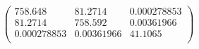 \documentclass{article}
\begin{document}
\[\left(
\begin{array}{ccc}
 758.648 & 81.2714 & 0.000278853 \\
 81.2714 & 758.592 & 0.00361966 \\
 0.000278853 & 0.00361966 & 41.1065 \\
\end{array}
\right)\]
\end{document}
